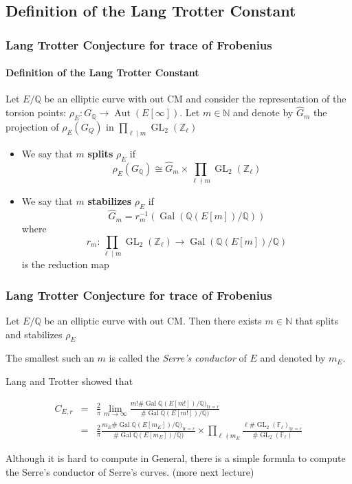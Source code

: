 \documentclass[10pt,final]{beamer} %
\newcommand{\Q}{\mathbb Q}
\newcommand{\Z}{\mathbb Z}
\newcommand{\N}{\mathbb N}
\newcommand{\F}{\mathbb F}
\theoremstyle{definition}
\begin{document}
\subsection{Definition of the Lang Trotter Constant}

\begin{frame}
\frametitle{Lang Trotter Conjecture for trace of Frobenius} 
\framesubtitle{Definition of the Lang Trotter Constant}

\begin{definition}
Let $E/\Q$ be an elliptic curve with out CM and consider the representation of the torsion points:\pause
$\rho_E: G_\Q\longrightarrow \operatorname{Aut}(E[\infty]).$\pause
Let $m\in\N$ and denote by $\hat{G}_m$ the projection of $\rho_E(G_Q)$ in
$\displaystyle\prod_{\ell\mid m}\operatorname{GL}_2(\Z_\ell)$\pause
\begin{itemize}[<+-| alert@+>]
\item We say that $m$ \textbf{splits} $\rho_{E}$ if 
 $$\rho_E(G_\Q)\cong \hat{G}_m\times \prod_{\ell\nmid m}\operatorname{GL}_2(\Z_\ell)$$
\item We say that $m$ \textbf{stabilizes} $\rho_{E}$ if
$$\hat{G}_m=r_m^{-1}(\operatorname{Gal}(\Q(E[m])/\Q))$$
where 
$$r_m:\prod_{\ell\mid m}\operatorname{GL}_2(\Z_\ell)\rightarrow\operatorname{Gal}(\Q(E[m])/\Q)$$
is the reduction map
\end{itemize}
\end{definition}

 \end{frame}

\begin{frame}
\frametitle{Lang Trotter Conjecture for trace of Frobenius} 

\begin{theorem}[Serre]
Let $E/\Q$ be an elliptic curve with out CM. Then there exists $m\in\N$ that splits and stabilizes $\rho_E$
\end{theorem}\pause

The smallest such an $m$ is called the \emph{Serre's conductor} of $E$ and denoted by $m_E$.\pause

Lang and Trotter showed that 

\begin{eqnarray*}
 C_{E,r}&=&\frac2\pi\lim_{m\rightarrow\infty}\frac{m!\#\operatorname{Gal}\Q(E[m!])/\Q)_{\text{tr}=r}}{\#\operatorname{Gal}\Q(E[m!])/\Q)}\\
 &=&\frac2\pi\frac{m_E\#\operatorname{Gal}\Q(E[m_E])/\Q)_{\text{tr}=r}}{\#\operatorname{Gal}\Q(E[m_E])/\Q)}
\times\prod_{\ell\nmid m_E}\frac{\ell\#\operatorname{GL}_2(\F_\ell)_{\text{tr}=r}}{\#\operatorname{GL}_2(\F_\ell)}\end{eqnarray*}\pause

Although it is hard to compute in General, there is a simple formula to compute the Serre's conductor of Serre's curves. (more next lecture)
\end{frame}
\end{document}
